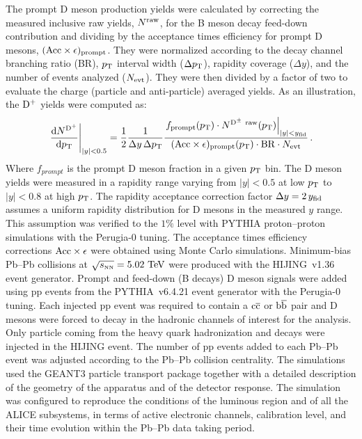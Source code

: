 The prompt D meson production yields were calculated by correcting the measured inclusive raw yields, 
$N^{\rm raw}$, for 
the B meson decay feed-down contribution and dividing by the acceptance times 
efficiency for prompt D mesons, $({\rm Acc}\times\epsilon)_{\rm prompt}$. 
They were normalized according to the decay channel  branching ratio ({\rm BR}), $p_{\rm T}$ interval width ($\Delta p_{\rm T}$), rapidity coverage 
($\Delta y$), and the number of events analyzed ($N_{\rm evt}$). They were then divided by a factor of two to evaluate the charge (particle and anti-particle) averaged yields. As an illustration, the ${\rm D^+}$  yields were computed as:
\begin{equation}
  \label{eq:dNdpt}
  \left.\frac{{\rm d} N^{\rm D^+}}{{\rm d}p_{\rm T}}\right|_{|y|<0.5}=
  \frac{1}{2}\frac{1}{ \Delta y \,\Delta p_{\rm T}}\frac{\left.f_{\rm prompt}(p_{\rm T})\cdot N^{\rm D^\pm~raw}(p_{\rm T})\right|_{|y|<y_{\rm fid}}}{({\rm Acc}\times\epsilon)_{\rm prompt}(p_{\rm T}) \cdot{\rm BR} \cdot N_{\rm evt}}\,.
\end{equation}
Where $f_{prompt}$ is the prompt D meson fraction in a given $p_{\rm T}$ bin. The D meson yields were measured in a rapidity range varying 
from $|y|<0.5$ at low $p_{\rm T}$ to $|y|<0.8$ at high $p_{\rm T}$.
The rapidity acceptance correction factor $\Delta y=2\,y_{\rm fid}$ assumes
a uniform rapidity  distribution for D mesons in the measured $y$ range.
This assumption was verified to the $1\%$ level with PYTHIA proton--proton simulations 
with the Perugia-0 tuning. The acceptance times efficiency corrections ${\rm Acc}\times\epsilon$ 
were obtained using Monte Carlo simulations. 
Minimum-bias Pb--Pb collisions at $\sqrt{s_{\rm \scriptscriptstyle NN}}=5.02~\mathrm{TeV}$
were produced with the HIJING~v1.36 event generator.
Prompt and feed-down (B decays) D meson signals were added using pp events from the PYTHIA~v6.4.21 
event generator with the Perugia-0 tuning. 
Each injected pp event was required to contain a $\rm c\overline c$ or $\rm b\overline b$ pair and D mesons
were forced to decay in the hadronic channels of interest for the analysis. Only particle coming from the heavy quark hadronization and decays were injected in the HIJING event. The number of pp events added to each Pb--Pb event was adjusted according to the Pb--Pb collision centrality. The simulations used the GEANT3 particle transport package together with a detailed description of the geometry of the apparatus and of the detector response.
The simulation was configured to reproduce the conditions of the luminous region and of all the ALICE subsystems, 
in terms of active electronic channels, calibration level, and their time evolution within the Pb--Pb data taking period. 


